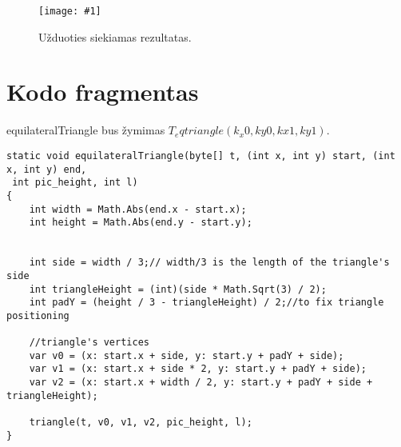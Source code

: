 \documentclass[a4paper,12pt]{article}
\newcommand{\imgc}[4]{
    \begin{figure}[h!]
        \centering
        \texttt{[image: \#1]}  %
        \caption{#3}  %
        \label{#4}  %
    \end{figure}
}
\begin{document}
\imgc{nuotraukos/Uzduotis.png}{0.8}{Užduoties siekiamas rezultatas.}{}

\section{Kodo fragmentas}

equilateralTriangle bus žymimas $T_eqtriangle(k_x0, ky0, kx1, ky1).$


\lstset{style=csharpstyle}
\begin{lstlisting}
static void equilateralTriangle(byte[] t, (int x, int y) start, (int x, int y) end,
 int pic_height, int l)
{
    int width = Math.Abs(end.x - start.x);
    int height = Math.Abs(end.y - start.y);


    int side = width / 3;// width/3 is the length of the triangle's side
    int triangleHeight = (int)(side * Math.Sqrt(3) / 2);
    int padY = (height / 3 - triangleHeight) / 2;//to fix triangle positioning

    //triangle's vertices
    var v0 = (x: start.x + side, y: start.y + padY + side);
    var v1 = (x: start.x + side * 2, y: start.y + padY + side);
    var v2 = (x: start.x + width / 2, y: start.y + padY + side + triangleHeight);

    triangle(t, v0, v1, v2, pic_height, l);
}

\end{lstlisting}

 
\end{document}
